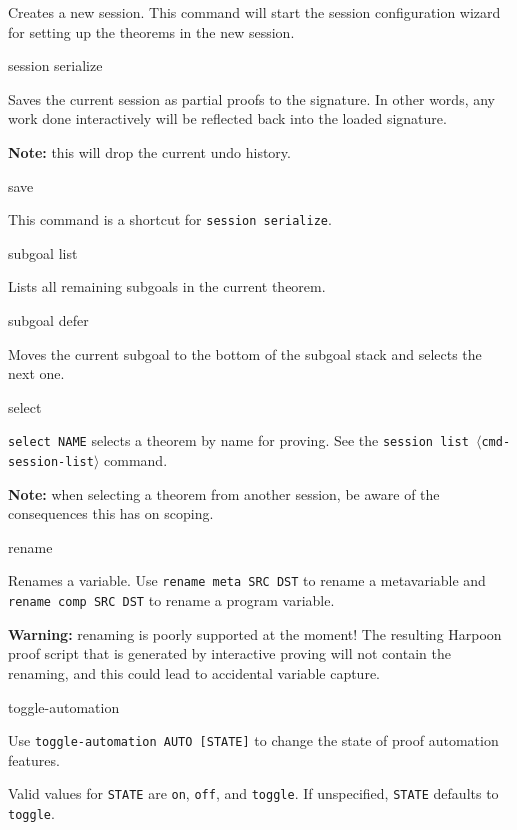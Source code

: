 \begin{description}
Creates a new session. This command will start the session configuration
wizard for setting up the theorems in the new session.

\item{\ttfamily session serialize}

Saves the current session as partial proofs to the signature.
In other words, any work done interactively will be reflected back into the
loaded signature.

\textbf{Note:} this will drop the current undo history.

\item{\ttfamily save}

This command is a shortcut for \texttt{session serialize}.

\item{\ttfamily subgoal list}

Lists all remaining subgoals in the current theorem.

\item{\ttfamily subgoal defer}

Moves the current subgoal to the bottom of the subgoal stack and selects the
next one.

\item{\ttfamily select}

\texttt{select NAME} selects a theorem by name for proving.
See the \texttt{session list $\langle$cmd-session-list$\rangle$} command.

\textbf{Note:} when selecting a theorem from another session, be aware of the
consequences this has on scoping.

\item{\ttfamily rename}

Renames a variable. Use \texttt{rename meta SRC DST} to rename a metavariable and
\texttt{rename comp SRC DST} to rename a program variable.

\textbf{Warning:} renaming is poorly supported at the moment!
The resulting Harpoon proof script that is generated by interactive proving
will not contain the renaming, and this could lead to accidental variable
capture.

\item{\ttfamily toggle-automation}

Use \texttt{toggle-automation AUTO [STATE]} to change the state of proof automation
features.

Valid values for \texttt{STATE} are \texttt{on}, \texttt{off}, and \texttt{toggle}. If unspecified,
\texttt{STATE} defaults to \texttt{toggle}.


\end{description}
